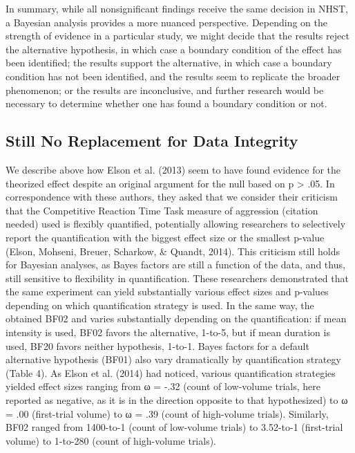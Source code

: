 \documentclass{article}
\begin{document}
In summary, while all nonsignificant findings receive the same decision in NHST, a Bayesian analysis provides a more nuanced perspective. Depending on the strength of evidence in a particular study, we might decide that the results reject the alternative hypothesis, in which case a boundary condition of the effect has been identified; the results support the alternative, in which case a boundary condition has not been identified, and the results seem to replicate the broader phenomenon; or the results are inconclusive, and further research would be necessary to determine whether one has found a boundary condition or not.

\subsection{Still No Replacement for Data Integrity} %
We describe above how Elson et al. (2013) seem to have found evidence for the theorized effect despite an original argument for the null based on p > .05. In correspondence with these authors, they asked that we consider their criticism that the Competitive Reaction Time Task measure of aggression (citation needed) used is flexibly quantified, potentially allowing researchers to selectively report the quantification with the biggest effect size or the smallest p-value (Elson, Mohseni, Breuer, Scharkow, \& Quandt, 2014). This criticism still holds for Bayesian analyses, as Bayes factors are still a function of the data, and thus, still sensitive to flexibility in quantification. These researchers demonstrated that the same experiment can yield substantially various effect sizes and p-values depending on which quantification strategy is used. In the same way, the obtained BF02 and varies substantially depending on the quantification: if mean intensity is used, BF02 favors the alternative, 1-to-5, but if mean duration is used, BF20 favors neither hypothesis, 1-to-1. Bayes factors for a default alternative hypothesis (BF01) also vary dramatically by quantification strategy (Table 4). As Elson et al. (2014) had noticed, various quantification strategies yielded effect sizes ranging from ω = -.32 (count of low-volume trials, here reported as negative, as it is in the direction opposite to that hypothesized) to ω = .00 (first-trial volume) to ω = .39 (count of high-volume trials). Similarly, BF02 ranged from 1400-to-1 (count of low-volume trials) to 3.52-to-1 (first-trial volume) to 1-to-280 (count of high-volume trials).
\end{document}
